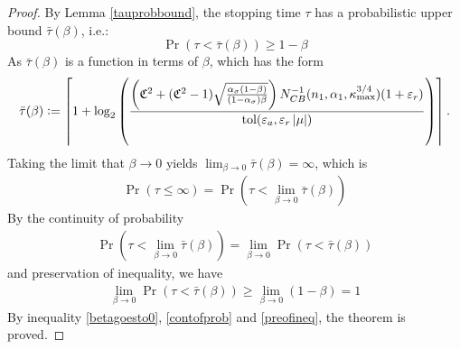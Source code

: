 \documentclass{iitthesis}
\theoremstyle{definition}
\begin{document}
\begin{proof}
By Lemma \ref{tauprobbound}, the stopping time $\tau$ has a probabilistic upper bound $\bar{\tau}(\beta)$,  i.e.:
$$\Pr(\tau < \bar{\tau}(\beta)) \geq 1-\beta$$
As $\bar{\tau}(\beta)$ is a function in terms of $\beta$, which has the form
$$\bar{\tau}(\beta):= \left \lceil 1+\log_2 \left(\frac{\left(\mathfrak{C}^2+(\mathfrak{C}^2-1)\sqrt{\frac{\alpha_{\sigma}(1-\beta)}{(1-\alpha_{\sigma})\beta}}\right) N_{CB}^{-1}(n_1,\alpha_1,\kappa_{\max}^{3/4})(1+\varepsilon_r)}{ \operatorname{tol}(\varepsilon_a,\varepsilon_r \left \lvert \mu \right \rvert)}\right) \right \rceil.$$
Taking the limit that $\beta \to 0$ yields $\lim_{\beta \to 0} \bar{\tau}(\beta) = \infty$, which is
\begin{align}\label{betagoesto0}
\Pr(\tau \leq \infty) = \Pr(\tau  <\lim_{\beta \to 0}\bar{\tau}(\beta)) 
\end{align}
By the continuity of probability 
\begin{align}\label{contofprob}
 \Pr(\tau  <\lim_{\beta \to 0}\bar{\tau}(\beta)) =\lim_{\beta \to 0} \Pr(\tau  <\bar{\tau}(\beta)) 
\end{align}
and preservation of inequality, we have
\begin{align}\label{preofineq}
\lim_{\beta \to 0} \Pr(\tau  <\bar{\tau}(\beta)) 
\geq \lim_{\beta \to 0}(1-\beta) = 1
\end{align}
By inequality \eqref{betagoesto0}, \eqref{contofprob} and \eqref{preofineq}, the theorem is proved.
\end{proof}
\end{document}
